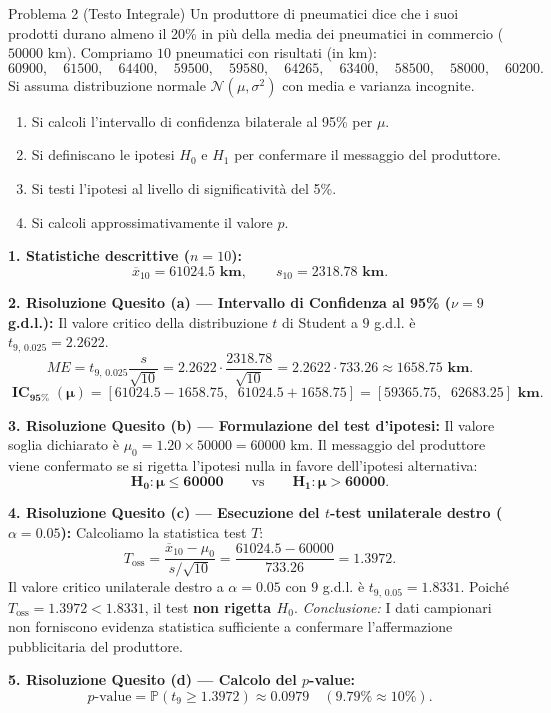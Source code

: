 \documentclass[11pt,a4paper]{article}
\newcommand{\Prob}{\mathbb{P}}
\begin{document}
\begin{problemabox}{Problema 2 (Testo Integrale)}
Un produttore di pneumatici dice che i suoi prodotti durano almeno il 20\% in più della media dei pneumatici in commercio ($50000\text{ km}$). Compriamo $10$ pneumatici con risultati (in km):
\[
60900, \quad 61500, \quad 64400, \quad 59500, \quad 59580, \quad 64265, \quad 63400, \quad 58500, \quad 58000, \quad 60200.
\]
Si assuma distribuzione normale $\mathcal{N}(\mu, \sigma^2)$ con media e varianza incognite.
\begin{enumerate}[label=(\alph*)]
    \item Si calcoli l'intervallo di confidenza bilaterale al 95\% per $\mu$.
    \item Si definiscano le ipotesi $H_0$ e $H_1$ per confermare il messaggio del produttore.
    \item Si testi l'ipotesi al livello di significatività del 5\%.
    \item Si calcoli approssimativamente il valore $p$.
\end{enumerate}
\end{problemabox}

\begin{soluzionebox}
\textbf{1. Statistiche descrittive ($n = 10$):}
\[
\overline{x}_{10} = \mathbf{61024.5\text{ km}}, \qquad s_{10} = \mathbf{2318.78\text{ km}}.
\]

\textbf{2. Risoluzione Quesito (a) --- Intervallo di Confidenza al 95\% ($\nu = 9$ g.d.l.):}
Il valore critico della distribuzione $t$ di Student a $9$ g.d.l. è $t_{9, \, 0.025} = 2.2622$.
\[
ME = t_{9, \, 0.025} \frac{s}{\sqrt{10}} = 2.2622 \cdot \frac{2318.78}{\sqrt{10}} = 2.2622 \cdot 733.26 \approx \mathbf{1658.75\text{ km}}.
\]
\[
\mathbf{\operatorname{IC}_{95\%}(\mu) = [61024.5 - 1658.75, \;\; 61024.5 + 1658.75] = [59365.75, \;\; 62683.25]\text{ km}}.
\]

\textbf{3. Risoluzione Quesito (b) --- Formulazione del test d'ipotesi:}
Il valore soglia dichiarato è $\mu_0 = 1.20 \times 50000 = 60000\text{ km}$.
Il messaggio del produttore viene confermato se si rigetta l'ipotesi nulla in favore dell'ipotesi alternativa:
\[
\mathbf{H_0: \mu \le 60000} \qquad \text{vs} \qquad \mathbf{H_1: \mu > 60000}.
\]

\textbf{4. Risoluzione Quesito (c) --- Esecuzione del $t$-test unilaterale destro ($\alpha = 0.05$):}
Calcoliamo la statistica test $T$:
\[
T_{\text{oss}} = \frac{\overline{x}_{10} - \mu_0}{s/\sqrt{10}} = \frac{61024.5 - 60000}{733.26} = \mathbf{1.3972}.
\]
Il valore critico unilaterale destro a $\alpha = 0.05$ con $9$ g.d.l. è $t_{9, \, 0.05} = 1.8331$.
Poiché $T_{\text{oss}} = 1.3972 < 1.8331$, il test \textbf{non rigetta $H_0$}.
\emph{Conclusione:} I dati campionari non forniscono evidenza statistica sufficiente a confermare l'affermazione pubblicitaria del produttore.

\textbf{5. Risoluzione Quesito (d) --- Calcolo del $p$-value:}
\[
p\text{-value} = \Prob(t_9 \ge 1.3972) \approx \mathbf{0.0979} \quad (\mathbf{9.79\%} \approx 10\%).
\]
\end{soluzionebox}
\end{document}
